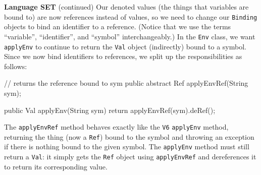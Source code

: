 \begin{minipage}[t]{\sw}
\slidenumber
\LARGE
{\bf Language SET} (continued)\exx
Our denoted values (the things that variables are bound to)
are now references instead of values,
so we need to change our \verb'Binding' objects
to bind an identifier to a reference.
(Notice that we use the terms ``variable'', ``identifier'', and ``symbol''
interchangeably.)\exx
{\Large\emm{}}\exx
In the \verb'Env' class,
we want \verb'applyEnv' to continue
to return the \verb'Val' object (indirectly) bound to a symbol.
Since we now bind identifiers to references,
we split up the responsibilities as follows:
{\Large
\begin{qv}
// returns the reference bound to sym
public abstract Ref applyEnvRef(String sym);

public Val applyEnv(String sym) {
    return applyEnvRef(sym).deRef();
}
\end{qv}
}
The \verb'applyEnvRef' method behaves exactly
like the \verb'V6' \verb'applyEnv' method,
returning the thing (now a \verb'Ref') bound to the symbol
and throwing an exception if there is nothing bound
to the given symbol.
The \verb'applyEnv' method must still return a \verb'Val':
it simply gets the \verb'Ref' object
using \verb'applyEnvRef' and dereferences it
to return its corresponding value.
\end{minipage}
\clearpage
